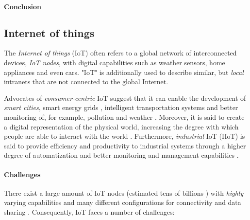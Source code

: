 \paragraph{Conclusion}

\subsection{Internet of things}

The \textit{Internet of things} (IoT) often refers to a global network
of interconnected devices, \textit{IoT nodes}, with digital capabilities such
as weather sensors, home appliances and even cars. "IoT" is additionally
used to describe similar, but \textit{local} intranets that are not
connected to the global Internet. 

Advocates of \textit{consumer-centric} IoT suggest that it can enable
the development of \textit{smart cities}, smart energy grids
\cite{reynaIntegration}, intelligent transportation systems and better
monitoring of, for example, pollution and weather
\cite{sisinniIndustrial}. Moreover, it is said to create a digital
representation of the physical world, increasing the degree with which
people are able to interact with the world
\cite{reynaIntegration,viriyasitavatIot}. Furthermore,
\textit{industrial} IoT (IIoT) is said to provide efficiency and
productivity to industrial systems through a higher degree of
automatization and better monitoring and management capabilities
\cite{coleBlockchain,sisinniIndustrial}.


\paragraph{Challenges} There exist a large amount of IoT nodes
(estimated tens of billions \cite{reynaIntegration}) with
\textit{highly} varying capabilities and many different configurations
for connectivity and data sharing \cite{sisinniIndustrial}.
Consequently, IoT faces a number of challenges:

